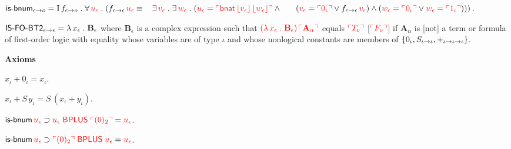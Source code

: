 \begin{biformthy}
    \item $\mbox{\sf is-bnum}_{\epsilon \rightarrow o} = 
      \mbox{\rm I}\, f_{\epsilon \rightarrow o} \mathrel.
      \forall\, \textcolor{red}{u_\epsilon} \mathrel.
      (f_{\epsilon \rightarrow \epsilon} \, \textcolor{red}{u_\epsilon} \equiv {}\\
      \hspace*{2ex}\exists\, \textcolor{red}{v_\epsilon} \mathrel. 
      \exists\, \textcolor{red}{w_\epsilon} \mathrel.
      (\textcolor{red}{u_\epsilon} = \textcolor{red}{\ulcorner\mbox{\sf bnat} \, 
      \lfloor v_\epsilon\rfloor \, \lfloor w_\epsilon\rfloor\urcorner} \wedge {}\\
      \hspace*{4ex}(\textcolor{red}{v_\epsilon} = \textcolor{red}{\ulcorner0_\iota\urcorner} \vee 
      f_{\epsilon \rightarrow \epsilon} \, \textcolor{red}{v_\epsilon}) \wedge
      (\textcolor{red}{w_\epsilon} = \textcolor{red}{\ulcorner0_\iota\urcorner} \vee 
      \textcolor{red}{w_\epsilon} = \textcolor{red}{\ulcorner1_\iota\urcorner})))$.

    \item $\mbox{\sf IS-FO-BT2}_{\epsilon \rightarrow \epsilon} = \lambda\,
      x_\epsilon \mathrel. \textbf{B}_\epsilon$ {\sglsp} where
      $\textbf{B}_\epsilon$ is a complex expression such that
      $\textcolor{red}{(\lambda\, x_\epsilon \mathrel. \textbf{B}_\epsilon) \,
        \ulcorner\textbf{A}_\alpha\urcorner}$ equals $\textcolor{red}{\ulcorner T_o\urcorner}$
      [$\textcolor{red}{\ulcorner F_o\urcorner}$] if $\textbf{A}_\alpha$ is [not] a term
      or formula of first-order logic with equality whose variables
      are of type $\iota$ and whose nonlogical constants are members
      of ${\{ 0_\iota,S_{\iota \rightarrow \iota},+_{\iota \rightarrow \iota
          \rightarrow \iota} \}}$.
      
  \ee

  \item[] \textbf{Axioms}

  \be

    \setcounter{enumi}{2}

    \item $x_\iota + 0_\iota = x_\iota$.

    \item $x_\iota + S \, y_\iota = S \, (x_\iota + y_\iota)$.

    \item $\mbox{\sf is-bnum} \, \textcolor{red}{u_\epsilon} \supset
      \textcolor{red}{u_\epsilon \; \mbox{\sf BPLUS} \; \ulcorner(0)_2\urcorner} =
      \textcolor{red}{u_\epsilon}$.

    \item $\mbox{\sf is-bnum} \, \textcolor{red}{u_\epsilon} \supset
      \textcolor{red}{\ulcorner(0)_2\urcorner \; \mbox{\sf BPLUS} \; u_\epsilon} =
      \textcolor{red}{u_\epsilon}$.


\end{biformthy}
